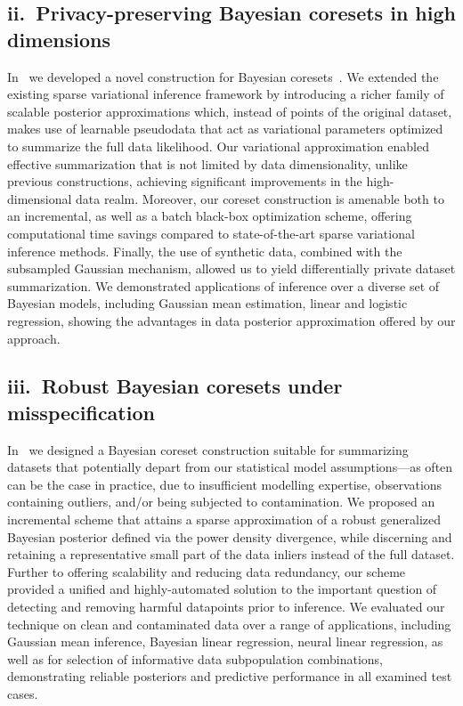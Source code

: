 \documentclass[11pt,a4paper,sans]{moderncv} %
\begin{document}
\subsection{ii.~Privacy-preserving Bayesian coresets in high dimensions}
\label{subsec:ch4-summary}
In~\citep{psvi} we developed a novel construction for Bayesian coresets~\citep{huggins16,campbell18,campbell19jmlr,campbell19neurips}. We extended the existing sparse variational inference framework by introducing a richer family of scalable posterior approximations which, instead of points of the original dataset, makes use of learnable pseudodata that act as variational parameters optimized to summarize the full data likelihood. Our variational approximation enabled effective summarization that is not limited by data dimensionality, unlike previous constructions, achieving significant improvements in the high-dimensional data realm. Moreover, our coreset construction is amenable both to an incremental, as well as a batch black-box optimization scheme, offering computational time savings compared to state-of-the-art sparse variational inference methods. Finally, the use of synthetic data, combined with the subsampled Gaussian mechanism, allowed us to yield differentially private dataset summarization. We demonstrated applications of inference over a diverse set of Bayesian models, including Gaussian mean estimation, linear and logistic regression, showing the advantages in data posterior approximation offered by our approach.

\subsection{iii.~Robust Bayesian coresets under misspecification}
\label{subsec:ch4-summary}
In~\citep{beta-cores} we designed a Bayesian coreset construction suitable for summarizing datasets that potentially depart from our statistical model assumptions---as often can be the case in practice, due to insufficient modelling expertise, observations containing outliers, and/or being subjected to contamination. We proposed an incremental scheme that attains a sparse approximation of a robust generalized Bayesian posterior defined via the power density divergence, while discerning and retaining a representative small part of the data inliers instead of the full dataset. Further to offering scalability and reducing data redundancy, our scheme provided a unified and highly-automated solution to the important question of detecting and removing harmful datapoints prior to inference. We evaluated our technique on clean and contaminated data over a range of applications, including Gaussian mean inference, Bayesian linear regression, neural linear regression, as well as for selection of informative data subpopulation combinations, demonstrating reliable posteriors and predictive performance in all examined test cases.
\end{document}
